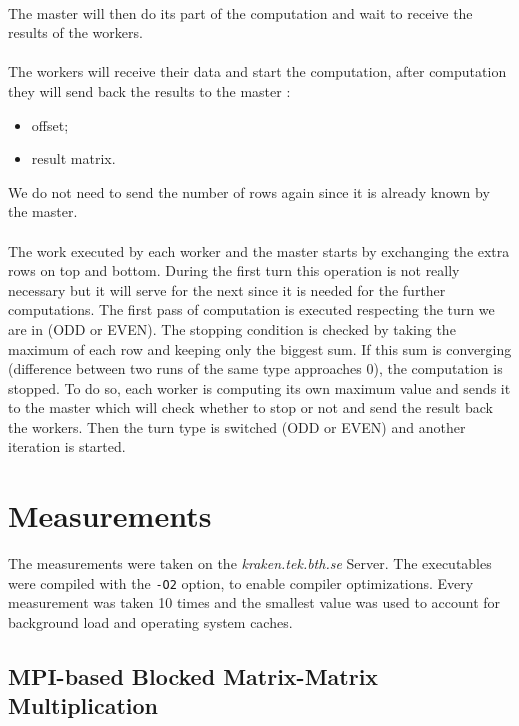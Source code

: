\documentclass[]{article}
\begin{document}
\paragraph{} The master will then do its part of the computation and wait to receive the results of the workers. 

\paragraph{} The workers will receive their data and start the computation, after computation they will send back the results to the master : 
\begin{itemize}
	\item offset;
	\item result matrix.
\end{itemize}
We do not need to send the number of rows again since it is already known by the master. 

\paragraph{} The work executed by each worker and the master starts by exchanging the extra rows on top and bottom. During the first turn this operation is not really necessary but it will serve for the next since it is needed for the further computations. The first pass of computation is executed respecting the turn we are in (ODD or EVEN). The stopping condition is checked by taking the maximum of each row and keeping only the biggest sum. If this sum is converging (difference between two runs of the same type approaches $0$), the computation is stopped. To do so, each worker is computing its own maximum value and sends it to the master which will check whether to stop or not and send the result back the workers. Then the turn type is switched (ODD or EVEN) and another iteration is started.

\section{Measurements}

The measurements were taken on the \emph{kraken.tek.bth.se} Server. The executables were compiled with the \texttt{-O2} option, to enable compiler optimizations. Every measurement was taken 10 times and the smallest value was used to account for background load and operating system caches.

\subsection{MPI-based Blocked Matrix-Matrix Multiplication}
\end{document}
